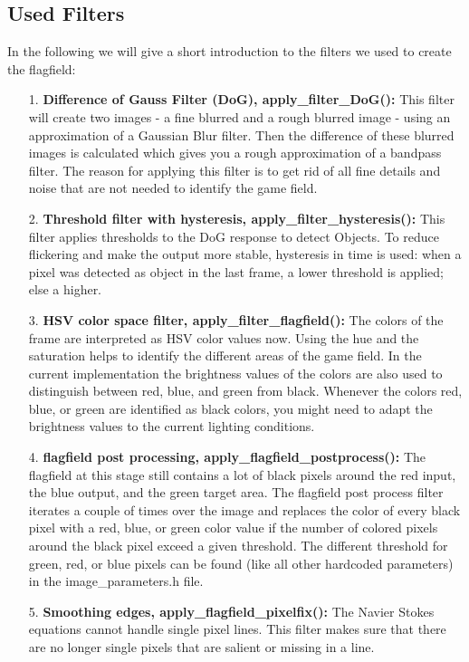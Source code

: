 \subsection{Used Filters}
In the following we will give a short introduction to the filters we used to create the flagfield:
\begin{itemize}
	\item[1.] \textbf{Difference of Gauss Filter (DoG), apply\_filter\_DoG():} This filter will create two images - a fine blurred and a rough blurred image - using an approximation of a Gaussian Blur filter. Then the difference of these blurred images is calculated which gives you a rough approximation of a bandpass filter. The reason for applying this filter is to get rid of all fine details and noise that are not needed to identify the game field. 

	\item[2.] \textbf{Threshold filter with hysteresis, apply\_filter\_hysteresis():}  This filter applies thresholds to the DoG response to detect Objects. To reduce flickering and make the output more stable, hysteresis in time is used: when a pixel was detected as object in the last frame, a lower threshold is applied; else a higher. 
	
	\item[3.] \textbf{HSV color space filter, apply\_filter\_flagfield():} The colors of the frame are interpreted as HSV color values now. Using the hue and the saturation helps to identify the different areas of the game field. In the current implementation the brightness values of the colors are also used to distinguish between red, blue, and green from black. Whenever the colors red, blue, or green are identified as black colors, you might need to adapt the brightness values to the current lighting conditions.

	\item[4.] \textbf{flagfield post processing, apply\_flagfield\_postprocess():} The flagfield at this stage still contains a lot of black pixels around the red input, the blue output, and the green target area. The flagfield post process filter iterates a couple of times over the image and replaces the color of every black pixel with a red, blue, or green color value if the number of colored pixels around the black pixel exceed a given threshold. The different threshold for green, red, or blue pixels can be found (like all other hardcoded parameters) in the image\_parameters.h file.

	\item[5.] \textbf{Smoothing edges, apply\_flagfield\_pixelfix():} The Navier Stokes equations cannot handle single pixel lines. This filter makes sure that there are no longer single pixels that are salient or missing in a line.

\end{itemize}


